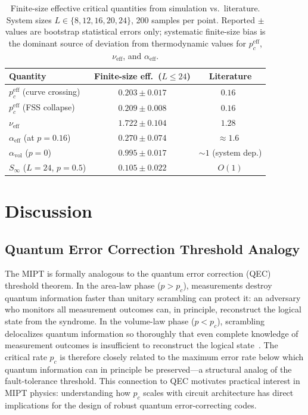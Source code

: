 \documentclass[twocolumn,prl,aps,floatfix]{revtex4-2}
\begin{document}
\begin{table}
  \caption{Finite-size effective critical quantities from simulation vs.\ literature.
           System sizes $L \in \{8, 12, 16, 20, 24\}$, 200 samples per point.
           Reported $\pm$ values are bootstrap statistical errors only;
           systematic finite-size bias is the dominant source of deviation from
           thermodynamic values for $p_c^{\mathrm{eff}}$, $\nu_{\mathrm{eff}}$,
           and $\alpha_{\mathrm{eff}}$.}
  \begin{ruledtabular}
    \begin{tabular}{lcc}
      Quantity & Finite-size eff.\ ($L\leq 24$) & Literature \\
      \hline
      $p_c^{\mathrm{eff}}$ (curve crossing)  & $0.203 \pm 0.017$ & $0.16$~\cite{Li2019}    \\
      $p_c^{\mathrm{eff}}$ (FSS collapse)    & $0.209 \pm 0.008$ & $0.16$~\cite{Li2019}    \\
      $\nu_{\mathrm{eff}}$                   & $1.722 \pm 0.104$ & $1.28$~\cite{Zabalo2020}\\
      $\alpha_{\mathrm{eff}}$ (at $p=0.16$)  & $0.270 \pm 0.074$ & $\approx 1.6$~\cite{Li2019} \\
      $\alpha_{\mathrm{vol}}$ ($p=0$)        & $0.995 \pm 0.017$ & ${\sim}1$ (system dep.) \\
      $S_{\infty}$ ($L=24$, $p=0.5$)        & $0.105 \pm 0.022$ & $O(1)$                  \\
    \end{tabular}
  \end{ruledtabular}
  \label{tab:critical}
\end{table}

\section{Discussion}
\label{sec:discussion}

\subsection{Quantum Error Correction Threshold Analogy}

The MIPT is formally analogous to the quantum error correction (QEC)
threshold theorem.
In the area-law phase ($p > p_c$), measurements destroy quantum information
faster than unitary scrambling can protect it: an adversary who monitors
all measurement outcomes can, in principle, reconstruct the logical state
from the syndrome.
In the volume-law phase ($p < p_c$), scrambling delocalizes quantum information
so thoroughly that even complete knowledge of measurement outcomes is insufficient
to reconstruct the logical state~\cite{Bao2020}.
The critical rate $p_c$ is therefore closely related to the maximum error rate
below which quantum information can in principle be preserved---a structural
analog of the fault-tolerance threshold.
This connection to QEC motivates practical interest in MIPT physics:
understanding how $p_c$ scales with circuit architecture has direct implications
for the design of robust quantum error-correcting codes.
\end{document}
